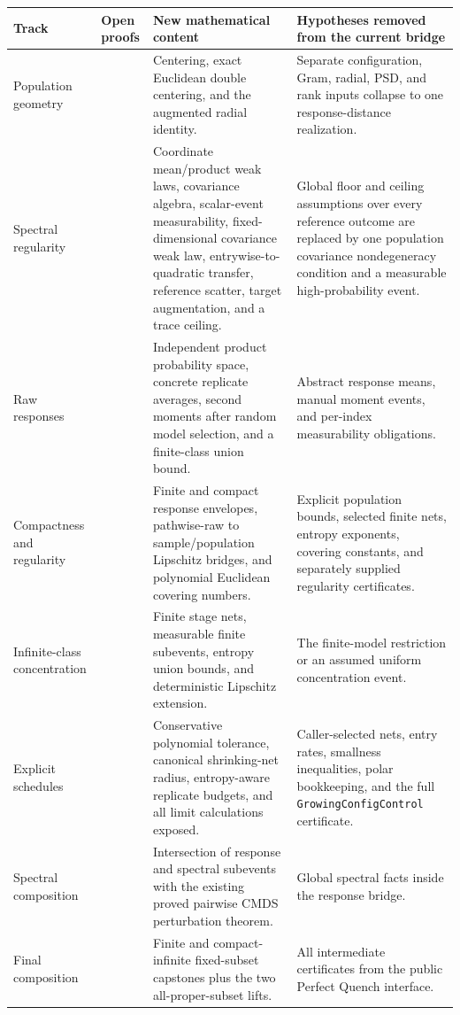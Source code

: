 \documentclass[11pt]{article}
\newcommand{\code}[1]{\texttt{#1}}
\begin{document}
\begin{longtable}{>{\raggedright\arraybackslash}p{}
                  >{\raggedright\arraybackslash}p{}
                  >{\raggedright\arraybackslash}p{}
                  >{\raggedright\arraybackslash}p{}}
\toprule
Track & Open proofs & New mathematical content & Hypotheses removed from the current bridge \\
\midrule
\endhead
Population geometry & 4 & Centering, exact Euclidean double centering, and the
augmented radial identity. & Separate configuration, Gram, radial, PSD, and rank
inputs collapse to one response-distance realization. \\
\addlinespace
Spectral regularity & 15 & Coordinate mean/product weak laws, covariance algebra,
scalar-event measurability, fixed-dimensional
covariance weak law, entrywise-to-quadratic transfer, reference scatter, target
augmentation, and a trace ceiling. & Global floor and ceiling assumptions over
every reference outcome are replaced by one population covariance
nondegeneracy condition and a measurable high-probability event. \\
\addlinespace
Raw responses & 9 & Independent product probability space, concrete replicate
averages, second moments after random model selection, and a finite-class union
bound. & Abstract response means, manual moment events, and per-index
measurability obligations. \\
\addlinespace
Compactness and regularity & 8 & Finite and compact response envelopes,
pathwise-raw to sample/population Lipschitz bridges, and polynomial Euclidean
covering numbers. & Explicit population bounds, selected finite nets, entropy
exponents, covering constants, and separately supplied regularity certificates.
\\
\addlinespace
Infinite-class concentration & 8 & Finite stage nets, measurable finite
subevents, entropy union bounds, and deterministic Lipschitz extension. & The
finite-model restriction or an assumed uniform concentration event. \\
\addlinespace
Explicit schedules & 10 & Conservative polynomial tolerance, canonical
shrinking-net radius, entropy-aware replicate budgets, and all limit
calculations exposed. & Caller-selected nets, entry rates, smallness
inequalities, polar bookkeeping, and the full
\code{GrowingConfigControl} certificate. \\
\addlinespace
Spectral composition & 3 & Intersection of response and spectral subevents with
the existing proved pairwise CMDS perturbation theorem. & Global spectral facts
inside the response bridge. \\
\addlinespace
Final composition & 4 & Finite and compact-infinite fixed-subset capstones plus
the two all-proper-subset lifts. & All intermediate certificates from the public
Perfect Quench interface. \\
\bottomrule
\end{longtable}
\end{document}
